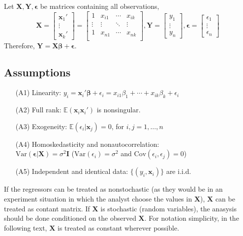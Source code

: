 \documentclass[%
 aip,
 jmp,%
 amsmath,amssymb,
 reprint,%
]{revtex4-1}
\def\b{\beta}
\def\e{\epsilon}
\def\s{\sigma}
\def\E{\mathbb{E}}
\def\Var{\mathrm{Var}}
\def\Cov{\mathrm{Cov}}
\newcommand{\mat}[1]{\bm{#1}}
\renewcommand{\vec}[1]{\bm{#1}}
\begin{document}
Let $\mat X,\vec Y,\vec\e$ be matrices containing all observations,
\[
\mat X =
\begin{bmatrix}
  \vec x_1' \\
  \vdots \\
  \vec x_k'
\end{bmatrix}
= \begin{bmatrix}
1 & x_{i1} & \cdots & x_{ik} \\
\vdots & \vdots & \ddots & \vdots \\
1 & x_{n1} & \cdots & x_{nk} \\
\end{bmatrix},
\vec Y =
\begin{bmatrix}
y_1 \\
\vdots \\
y_n
\end{bmatrix},
\vec \e =
\begin{bmatrix}
\e_1 \\
\vdots \\
\e_n
\end{bmatrix}
\]
Therefore, $\vec Y = \mat X \vec\b + \vec\e$.

\subsection{Assumptions}
\begin{enumerate}
    \item[(A1)] Linearity: $y_i = \vec x_i' \vec\b + \e_i = x_{i1}\b_1 + \cdots + x_{ik}\b_k + \e_i$
    \item[(A2)] Full rank: $\E(\vec x_i \vec x_i')$ is nonsingular.
    \item[(A3)] Exogeneity: $\E(\e_i|\vec x_j) = 0$, for $i,j=1,\dots,n$
    \item[(A4)] Homoskedasticity and nonautocorrelation: \\
    $\Var(\vec\e | \mat X) = \s^2 \mat I$ ($\Var(\e_i) = \s^2$ and $\Cov(\e_i, \e_j)=0$)
    \item[(A5)] Independent and identical data: $\{(y_i, \vec x_i)\}$ are i.i.d.
\end{enumerate}

If the regressors can be treated as nonstochastic (as they would be in an experiment situation
in which the analyst choose the values in $\mat X$), $\mat X$ can be treated as contant matrix.
If $\mat X$ is stochastic (random variables), the anasysis should be done conditioned on the
observed $\mat X$. For notation simplicity, in the following text, $\mat X$ is treated as
constant wherever possible.
\end{document}
